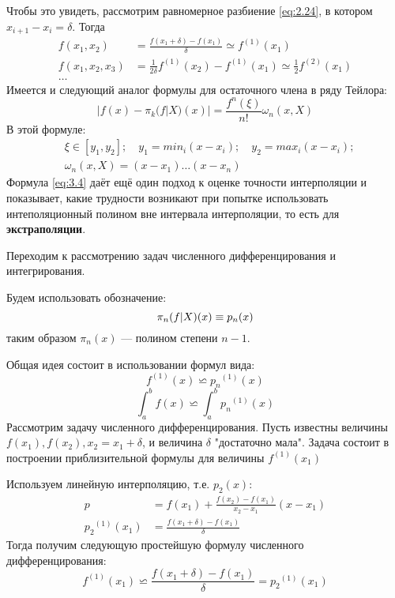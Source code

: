 Чтобы это увидеть, рассмотрим равномерное разбиение \ref{eq:2.24}, в котором $x_{i+1}-x_i=\delta$. Тогда 
\begin{dmath}
\begin{aligned}
	f(x_1, x_2) &= \frac{f(x_1+\delta) - f(x_1)}{\delta} \simeq f^{(1)}(x_1) \\
	f(x_1, x_2, x_3) &= \frac{1}{2\delta}f^{(1)}(x_2)-f^{(1)}(x_1) \simeq  \frac{1}{2}f^{(2)}(x_1) \\
	\dots
\end{aligned}
\end{dmath}
Имеется и следующий аналог формулы для остаточного члена в ряду Тейлора:
\begin{equation} \label{eq:3.4}
	|f(x) - \pi_k(f|X)(x)| = \frac{f^{n}(\xi)}{n!} \omega_n (x,X)
\end{equation}
В этой формуле:
\begin{equation}
\begin{aligned}
	&\xi \in [y_1, y_2]; \quad y_1=min_{i}(x-x_i); \quad y_2=max_{i}(x-x_i) ;\\ 
	&\omega_n(x, X) = (x-x_1)\dots(x-x_n)
\end{aligned}
\end{equation}
Формула \ref{eq:3.4} даёт ещё один подход к оценке точности интерполяции и показывает, какие трудности возникают при попытке использовать интеполяционный полином вне интервала интерполяции, то есть для \textbf{экстраполяции}.

\bigskip
Переходим к рассмотрению задач численного дифференцирования и интегрирования. 

Будем использовать обозначение:
\begin{equation}
	\pi_n(f|X)(x) \equiv p_n(x)\\
\end{equation}
таким образом $\pi_n(x)$ --- полином степени $n-1$.

Общая идея состоит в использовании формул вида: 
\begin{equation} \label{eq:2.8}
	f^{(1)}(x) \backsimeq {p_n}^{(1)}(x)
\end{equation}
\begin{equation}
	\int_{a}^{b}f(x) \backsimeq \int_{a}^{b}{p_n}^{(1)}(x)
\end{equation}
Рассмотрим задачу численного дифференцирования. Пусть известны величины $f(x_1), f(x_2), x_2 = x_1 + \delta$, и величина $\delta$ "достаточно мала". Задача состоит в построении приблизительной формулы для величины $f^{(1)}(x_1)$

Используем линейную интерполяцию, т.е. $p_2(x)$:
\begin{equation}
	\begin{aligned}
	p &= f(x_1) + \frac{f(x_2) - f(x_1)}{x_2-x_1}(x-x_1) \\
	{p_2}^{(1)}(x_1) &= \frac{f(x_1+\delta) - f(x_1)}{\delta}
	\end{aligned}
\end{equation}
Тогда получим следующую простейшую формулу численного дифференцирования:
\begin{dmath} \label{eq:3.10}
	f^{(1)}(x_1) \backsimeq \frac{f(x_1 + \delta) - f(x_1)}{\delta} = {p_2}^{(1)}(x_1)
\end{dmath}

